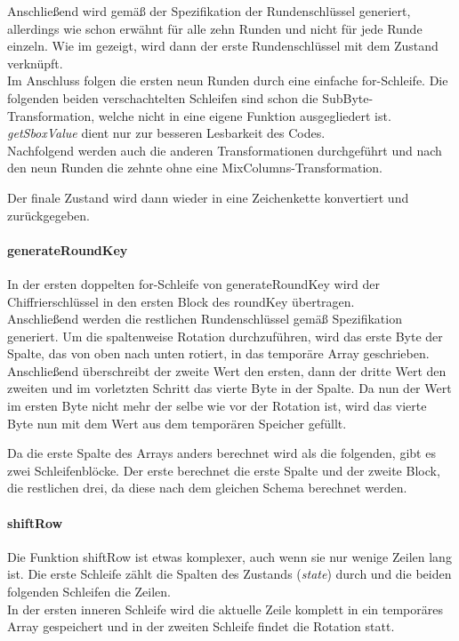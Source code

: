 		Anschließend wird gemäß der Spezifikation der Rundenschlüssel generiert, allerdings
		wie schon erwähnt für alle zehn Runden und nicht für jede Runde einzeln. Wie im
		 gezeigt, wird dann der erste Rundenschlüssel mit dem
		Zustand verknüpft. \\
		Im Anschluss folgen die ersten neun Runden durch eine einfache for-Schleife. Die
		folgenden beiden verschachtelten Schleifen sind schon die SubByte-Transformation,
		welche nicht in eine eigene Funktion ausgegliedert ist. \emph{getSboxValue} dient
		nur zur besseren Lesbarkeit des Codes. \\
		Nachfolgend werden auch die anderen Transformationen durchgeführt und nach den neun
		Runden die zehnte ohne eine MixColumns-Transformation.

		Der finale Zustand wird dann wieder in eine Zeichenkette konvertiert und
		zurückgegeben.

		\paragraph{generateRoundKey}
		In der ersten doppelten for-Schleife von generateRoundKey wird der Chiffrierschlüssel
		in den ersten Block des roundKey übertragen. \\
		Anschließend werden die restlichen Rundenschlüssel gemäß Spezifikation generiert.
		Um die spaltenweise Rotation durchzuführen, wird das erste Byte der Spalte, das von
		oben nach unten rotiert, in das temporäre Array geschrieben. Anschließend
		überschreibt der zweite Wert den ersten, dann der dritte Wert den zweiten und im
		vorletzten Schritt das vierte Byte in der Spalte. Da nun der Wert im ersten Byte
		nicht mehr der selbe wie vor der Rotation ist, wird das vierte Byte nun mit dem
		Wert aus dem temporären Speicher gefüllt.

		Da die erste Spalte des Arrays anders berechnet wird als die folgenden, gibt es
		zwei Schleifenblöcke. Der erste berechnet die erste Spalte und der zweite Block,
		die restlichen drei, da diese nach dem gleichen Schema berechnet werden.

		\paragraph{shiftRow}
		Die Funktion shiftRow ist etwas komplexer, auch wenn sie nur wenige Zeilen lang ist.
		Die erste Schleife zählt die Spalten des Zustands (\emph{state}) durch und die
		beiden folgenden Schleifen die Zeilen. \\
		In der ersten inneren Schleife wird die aktuelle Zeile komplett in ein temporäres
		Array gespeichert und in der zweiten Schleife findet die Rotation statt.

